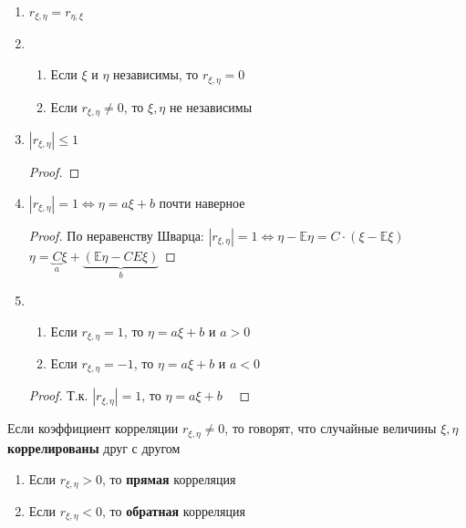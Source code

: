 \begin{prop}\itemfix
    \begin{enumerate}
        \item
              \(r_{\xi,\eta} = r_{\eta, \xi}\)

        \item
              \begin{enumerate}
                  \item Если \(\xi\) и \(\eta\) независимы, то \(r_{\xi, \eta} = 0\)
                  \item Если \(r_{\xi, \eta} \neq 0\), то \(\xi, \eta\) не независимы
              \end{enumerate}

        \item
              \(|r_{\xi,\eta}| \le 1\)

              \begin{proof}
                  \unfinished
              \end{proof}
        \item
              \(|r_{\xi, \eta}| = 1 \Leftrightarrow \eta = a\xi + b\) почти наверное

              \begin{proof}
                  По неравенству Шварца: \(|r_{\xi ,\eta}| = 1 \Leftrightarrow \eta - \mathbb{E}\eta = C\cdot(\xi - \mathbb{E}\xi)\) \
                  \(\eta = \underbrace{C}_a\xi + \underbrace{(\mathbb{E}\eta - CE\xi)}_b\)
              \end{proof}
        \item
              \begin{enumerate}
                  \item Если \(r_{\xi, \eta} = 1\), то \(\eta = a\xi + b\) и \(a > 0\)
                  \item Если \(r_{\xi, \eta} = -1\), то \(\eta = a\xi + b\) и \(a < 0\)
              \end{enumerate}

              \begin{proof}
                  Т.к. \(|r_{\xi,\eta}| = 1\), то \(\eta = a\xi + b\) \
                  \unfinished
              \end{proof}
    \end{enumerate}
\end{prop}
\begin{definition}
    Если коэффициент корреляции \(r_{\xi, \eta} \neq 0\), то говорят, что случайные величины \(\xi, \eta\) \textbf{коррелированы} друг с другом \\
    \begin{enumerate}
        \item Если \(r_{\xi,\eta} > 0\), то \textbf{прямая} корреляция
        \item Если \(r_{\xi,\eta} < 0\), то \textbf{обратная} корреляция
    \end{enumerate}
\end{definition}
